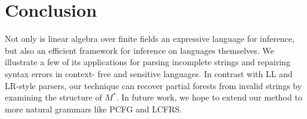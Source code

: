 \documentclass[sigplan,nonacm,anonymous]{acmart}\settopmatter{printfolios=false,printccs=false,printacmref=false}
\begin{document}
 \section{Conclusion}

  Not only is linear algebra over finite fields an expressive language for inference, but also an efficient framework for inference on languages themselves. We illustrate a few of its applications for parsing incomplete strings and repairing syntax errors in context- free and sensitive languages. In contrast with LL and LR-style parsers, our technique can recover partial forests from invalid strings by examining the structure of $M^*$. In future work, we hope to extend our method to more natural grammars like PCFG and LCFRS.

  
\end{document}
